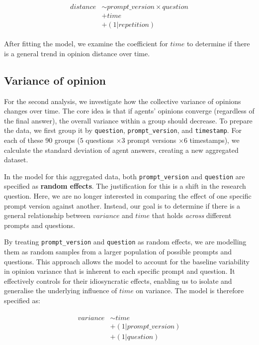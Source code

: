 \begin{align}
\begin{split}
    distance & \sim prompt\_version \times question \\
    &+ time \\ 
    &+ (1 |repetition)
\end{split}
\end{align}

After fitting the model, we examine the coefficient for $time$ to determine if there is a general trend in opinion distance over time.

\subsection{Variance of opinion}
\label{subsec:variance}

For the second analysis, we investigate how the collective variance of opinions changes over time. The core idea is that if agents' opinions converge (regardless of the final answer), the overall variance within a group should decrease. To prepare the data, we first group it by \texttt{question}, \texttt{prompt\_version}, and \texttt{timestamp}. For each of these 90 groups ($5$ questions $\times 3$ prompt versions $\times 6$ timestamps), we calculate the standard deviation of agent answers, creating a new aggregated dataset.

In the model for this aggregated data, both \texttt{prompt\_version} and \texttt{question} are specified as \textbf{random effects}. The justification for this is a shift in the research question. Here, we are no longer interested in comparing the effect of one specific prompt version against another. Instead, our goal is to determine if there is a general relationship between $variance$ and $time$ that holds \textit{across} different prompts and questions.

By treating \texttt{prompt\_version} and \texttt{question} as random effects, we are modelling them as random samples from a larger population of possible prompts and questions. This approach allows the model to account for the baseline variability in opinion variance that is inherent to each specific prompt and question. It effectively controls for their idiosyncratic effects, enabling us to isolate and generalise the underlying influence of $time$ on variance. The model is therefore specified as:

\begin{align}
\begin{split}
    variance & \sim time \\
    &+ (1 | prompt\_version) \\ 
    &+ (1 | question)
\end{split}
\end{align}

